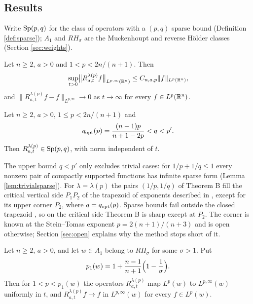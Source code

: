 \subsection{Results}
Write $\mathrm{Sp}(p,q)$ for the class of operators with a $(p,q)$ sparse bound (Definition
\ref{def:sparse}); $A_1$ and $RH_\sigma$ are the Muckenhoupt and reverse H\"older classes
(Section \ref{sec:weights}).

\begin{theoremA}
Let $n\ge2$, $a>0$ and $1<p<2n/(n+1)$. Then
\[
\sup_{t>0}\bigl\|R^{\lambda(p)}_{a,t}f\bigr\|_{L^{p,\infty}(\mathbb{R}^n)}\le C_{n,a,p}\|f\|_{L^p(\mathbb{R}^n)},
\]
and $\|R^{\lambda(p)}_{a,t}f-f\|_{L^{p,\infty}}\to0$ as $t\to\infty$ for every $f\in L^p(\mathbb{R}^n)$.
\end{theoremA}

\begin{theoremB}
Let $n\ge2$, $a>0$, $1\le p<2n/(n+1)$ and
\[
q_{\rm opt}(p)=\frac{(n-1)p}{n+1-2p}<q<p'.
\]
Then $R^{\lambda(p)}_{a,t}\in\mathrm{Sp}(p,q)$, with norm independent of $t$.
\end{theoremB}

The upper bound $q<p'$ only excludes trivial cases: for $1/p+1/q\le1$ every nonzero pair of
compactly supported functions has infinite sparse form (Lemma \ref{lem:trivialsparse}). For
$\lambda=\lambda(p)$ the pairs $(1/p,1/q)$ of Theorem B fill the critical vertical side $P_1P_2$ of
the trapezoid of exponents described in \cite[(1.5)]{BRS25}, except for its upper corner $P_2$,
where $q=q_{\rm opt}(p)$. Sparse bounds fail outside the closed trapezoid \cite{BBL17}, so on the
critical side Theorem B is sharp except at $P_2$. The corner is known at the Stein--Tomas exponent
$p=2(n+1)/(n+3)$ \cite[Theorem 1.5]{BRS25} and is open otherwise; Section \ref{sec:open} explains
why the method stops short of it.

\begin{theoremC}[Weights]
Let $n\ge 2$, $a>0$, and let $w\in A_1$ belong to $RH_{\sigma}$ for some $\sigma>1$. Put
\[
p_1(w)=1+\frac{n-1}{n+1}\Bigl(1-\frac1{\sigma}\Bigr).
\]
Then for $1<p<p_1(w)$ the operators $R^{\lambda(p)}_{a,t}$ map $L^p(w)$ to $L^{p,\infty}(w)$
uniformly in $t$, and $R^{\lambda(p)}_{a,t}f\to f$ in $L^{p,\infty}(w)$ for every $f\in L^p(w)$.
\end{theoremC}

